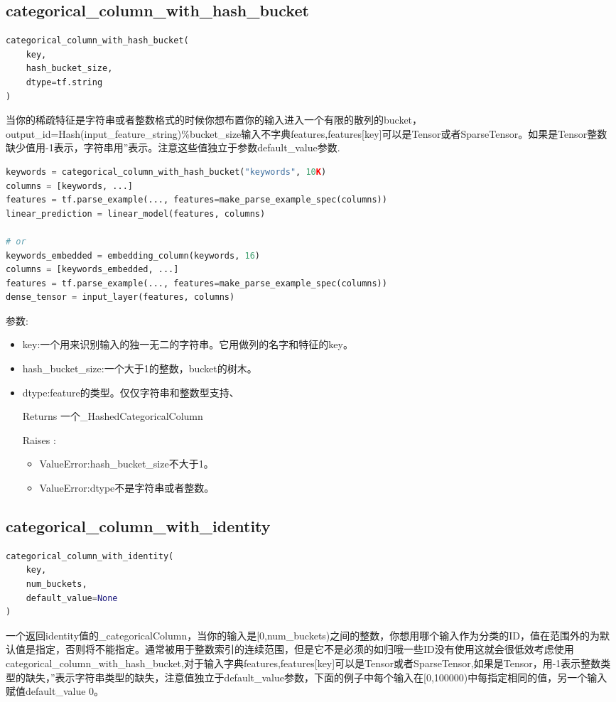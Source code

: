 \subsection{categorical\_column\_with\_hash\_bucket}
\begin{lstlisting}[language=Python]
categorical_column_with_hash_bucket(
    key,
    hash_bucket_size,
    dtype=tf.string
)
\end{lstlisting}
当你的稀疏特征是字符串或者整数格式的时候你想布置你的输入进入一个有限的散列的bucket，output\_id=Hash(input\_feature\_string)\%bucket\_size输入不字典features,features[key]可以是Tensor或者SparseTensor。如果是Tensor整数缺少值用-1表示，字符串用''表示。注意这些值独立于参数default\_value参数.
\begin{lstlisting}[language=Python]
keywords = categorical_column_with_hash_bucket("keywords", 10K)
columns = [keywords, ...]
features = tf.parse_example(..., features=make_parse_example_spec(columns))
linear_prediction = linear_model(features, columns)

# or
keywords_embedded = embedding_column(keywords, 16)
columns = [keywords_embedded, ...]
features = tf.parse_example(..., features=make_parse_example_spec(columns))
dense_tensor = input_layer(features, columns)
\end{lstlisting}
参数:
\begin{itemize}
	\item key:一个用来识别输入的独一无二的字符串。它用做列的名字和特征的key。
	\item hash\_bucket\_size:一个大于1的整数，bucket的树木。
	\item dtype:feature的类型。仅仅字符串和整数型支持、
	\item[Returns] 一个\_HashedCategoricalColumn
	\item[Raises]:
	\begin{itemize}
		\item ValueError:hash\_bucket\_size不大于1。
		\item ValueError:dtype不是字符串或者整数。
	\end{itemize}
\end{itemize}
\subsection{categorical\_column\_with\_identity}
\begin{lstlisting}[language=Python]
categorical_column_with_identity(
    key,
    num_buckets,
    default_value=None
)
\end{lstlisting}
一个返回identity值的\_categoricalColumn，当你的输入是[0,num\_buckets)之间的整数，你想用哪个输入作为分类的ID，值在范围外的为默认值是指定，否则将不能指定。通常被用于整数索引的连续范围，但是它不是必须的如归哦一些ID没有使用这就会很低效考虑使用categorical\_column\_with\_hash\_bucket,对于输入字典features,features[key]可以是Tensor或者SparseTensor,如果是Tensor，用-1表示整数类型的缺失，''表示字符串类型的缺失，注意值独立于default\_value参数，下面的例子中每个输入在[0,100000)中每指定相同的值，另一个输入赋值default\_value 0。

